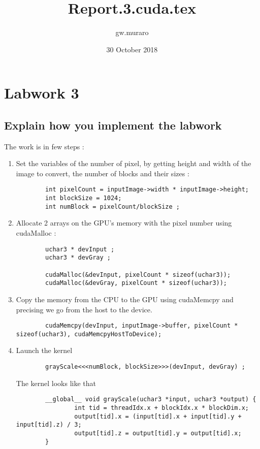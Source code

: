 \documentclass{article}
\title{Report.3.cuda.tex}
\author{gw.muraro }
\date{30 October 2018}
\begin{document}
\maketitle
\section{Labwork 3}
\subsection{Explain how you implement the labwork}

    The work is in few steps : 
    \begin{enumerate}
        \item Set the variables of the number of pixel, by getting height and width of the image to convert, the number of blocks and their sizes :
        \begin{verbatim}
        int pixelCount = inputImage->width * inputImage->height;
        int blockSize = 1024;
        int numBlock = pixelCount/blockSize ;
        \end{verbatim}
        
        \item Allocate 2 arrays on the GPU's memory with the pixel number using cudaMalloc :
        \begin{verbatim}
        uchar3 * devInput ;
        uchar3 * devGray ;

        cudaMalloc(&devInput, pixelCount * sizeof(uchar3));
        cudaMalloc(&devGray, pixelCount * sizeof(uchar3));    
        \end{verbatim}
        
        
        \item Copy the memory from the CPU to the GPU using cudaMemcpy and precising we go from the host to the device. 
        \begin{verbatim}
        cudaMemcpy(devInput, inputImage->buffer, pixelCount * sizeof(uchar3), cudaMemcpyHostToDevice);
        \end{verbatim}
        
        
        \item Launch the kernel 
        \begin{verbatim}
        grayScale<<<numBlock, blockSize>>>(devInput, devGray) ;
        \end{verbatim}
        
        The kernel looks like that
        \begin{verbatim}
        __global__ void grayScale(uchar3 *input, uchar3 *output) {
                int tid = threadIdx.x + blockIdx.x * blockDim.x;
                output[tid].x = (input[tid].x + input[tid].y + input[tid].z) / 3;
                output[tid].z = output[tid].y = output[tid].x;
        }
    

\end{verbatim}
\end{enumerate}
\end{document}
